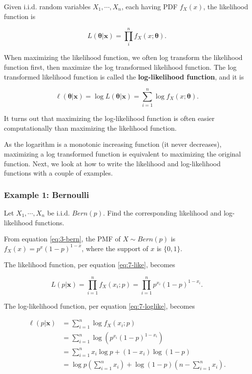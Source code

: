 \documentclass[
]{book}
\begin{document}
Given i.i.d. random variables \(X_1, \cdots, X_n\), each having PDF \(f_X(x)\), the likelihood function is

\begin{equation} 
L(\boldsymbol{\theta} | \boldsymbol{x} ) = \prod_i^n f_X(x; \boldsymbol{\theta}).
\label{eq:7-like}
\end{equation}

When maximizing the likelihood function, we often log transform the likelihood function first, then maximize the log transformed likelihood function. The log transformed likelihood function is called the \textbf{log-likelihood function}, and it is

\begin{equation} 
\ell(\boldsymbol{\theta} | \boldsymbol{x}) = \log L(\boldsymbol{\theta} | \boldsymbol{x}) = \sum_{i=1}^n \log f_X(x; \boldsymbol{\theta}).
\label{eq:7-loglike}
\end{equation}

It turns out that maximizing the log-likelihood function is often easier computationally than maximizing the likelihood function.

As the logarithm is a monotonic increasing function (it never decreases), maximizing a log transformed function is equivalent to maximizing the original function. Next, we look at how to write the likelihood and log-likelihood functions with a couple of examples.

\hypertarget{example-1-bernoulli}{%
\subsubsection{Example 1: Bernoulli}\label{example-1-bernoulli}}

Let \(X_1, \cdots, X_n\) be i.i.d. \(Bern(p)\). Find the corresponding likelihood and log-likelihood functions.

From equation \eqref{eq:3-bern}, the PMF of \(X \sim Bern(p)\) is \(f_X(x) = p^x (1-p)^{1-x}\), where the support of \(x\) is \(\{0,1\}\).

The likelihood function, per equation \eqref{eq:7-like}, becomes

\[
L(p | \boldsymbol{x} ) = \prod_{i=1}^n f_X(x_i; p) = \prod_{i=1}^n p^{x_i} (1-p)^{1-x_i}.
\]

The log-likelihood function, per equation \eqref{eq:7-loglike}, becomes

\[
\begin{split}
\ell (p | \boldsymbol{x}) &= \sum_{i=1}^n \log f_X(x_i;p) \\
                          &= \sum_{i=1}^n \log \left( p^{x_i} (1-p)^{1-x_i} \right) \\
                          &= \sum_{i=1}^n x_i \log p + (1-x_i) \log (1-p) \\
                          &= \log p \left(\sum_{i=1}^n x_i \right) + \log (1-p) \left( n - \sum_{i=1}^n x_i \right).
\end{split}
\]
\end{document}
